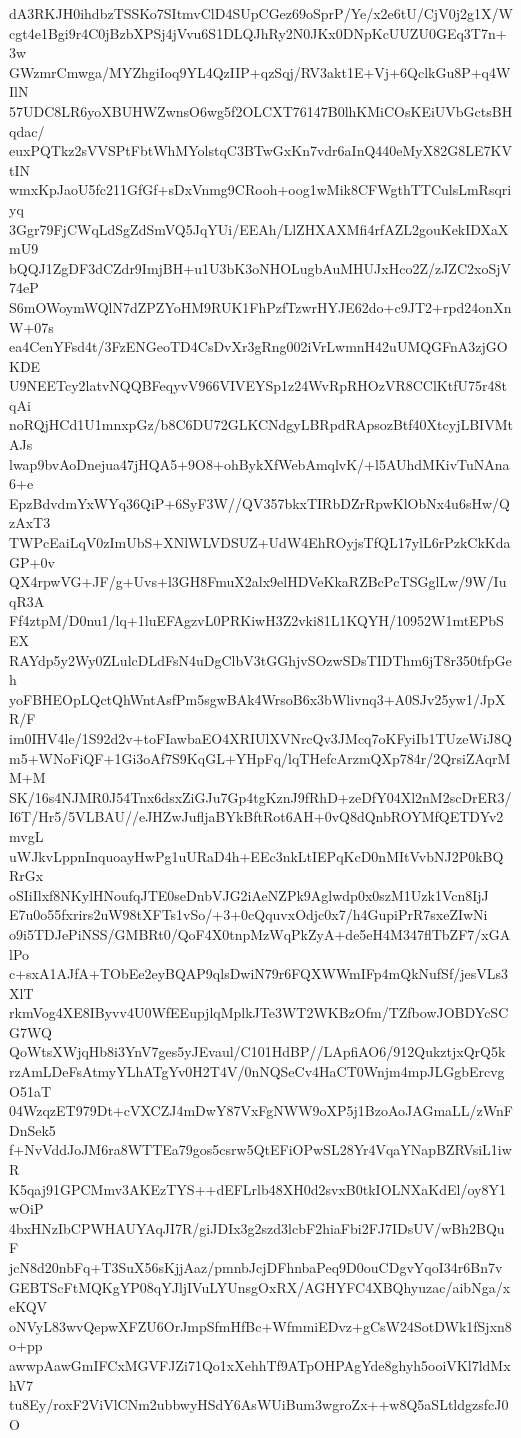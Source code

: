 dA3RKJH0ihdbzTSSKo7SItmvClD4SUpCGez69oSprP/Ye/x2e6tU/CjV0j2g1X/W
cgt4e1Bgi9r4C0jBzbXPSj4jVvu6S1DLQJhRy2N0JKx0DNpKcUUZU0GEq3T7n+3w
GWzmrCmwga/MYZhgiIoq9YL4QzIIP+qzSqj/RV3akt1E+Vj+6QclkGu8P+q4WIlN
57UDC8LR6yoXBUHWZwnsO6wg5f2OLCXT76147B0lhKMiCOsKEiUVbGctsBHqdac/
euxPQTkz2sVVSPtFbtWhMYolstqC3BTwGxKn7vdr6aInQ440eMyX82G8LE7KVtIN
wmxKpJaoU5fc211GfGf+sDxVnmg9CRooh+oog1wMik8CFWgthTTCulsLmRsqriyq
3Ggr79FjCWqLdSgZdSmVQ5JqYUi/EEAh/LlZHXAXMfi4rfAZL2gouKekIDXaXmU9
bQQJ1ZgDF3dCZdr9ImjBH+u1U3bK3oNHOLugbAuMHUJxHco2Z/zJZC2xoSjV74eP
S6mOWoymWQlN7dZPZYoHM9RUK1FhPzfTzwrHYJE62do+c9JT2+rpd24onXnW+07s
ea4CenYFsd4t/3FzENGeoTD4CsDvXr3gRng002iVrLwmnH42uUMQGFnA3zjGOKDE
U9NEETcy2latvNQQBFeqyvV966VIVEYSp1z24WvRpRHOzVR8CClKtfU75r48tqAi
noRQjHCd1U1mnxpGz/b8C6DU72GLKCNdgyLBRpdRApsozBtf40XtcyjLBIVMtAJs
lwap9bvAoDnejua47jHQA5+9O8+ohBykXfWebAmqlvK/+l5AUhdMKivTuNAna6+e
EpzBdvdmYxWYq36QiP+6SyF3W//QV357bkxTIRbDZrRpwKlObNx4u6sHw/QzAxT3
TWPcEaiLqV0zImUbS+XNlWLVDSUZ+UdW4EhROyjsTfQL17ylL6rPzkCkKdaGP+0v
QX4rpwVG+JF/g+Uvs+l3GH8FmuX2alx9elHDVeKkaRZBcPcTSGglLw/9W/IuqR3A
Ff4ztpM/D0nu1/lq+1luEFAgzvL0PRKiwH3Z2vki81L1KQYH/10952W1mtEPbSEX
RAYdp5y2Wy0ZLulcDLdFsN4uDgClbV3tGGhjvSOzwSDsTIDThm6jT8r350tfpGeh
yoFBHEOpLQctQhWntAsfPm5sgwBAk4WrsoB6x3bWlivnq3+A0SJv25yw1/JpXR/F
im0IHV4le/1S92d2v+toFIawbaEO4XRIUlXVNrcQv3JMcq7oKFyiIb1TUzeWiJ8Q
m5+WNoFiQF+1Gi3oAf7S9KqGL+YHpFq/lqTHefcArzmQXp784r/2QrsiZAqrMM+M
SK/16s4NJMR0J54Tnx6dsxZiGJu7Gp4tgKznJ9fRhD+zeDfY04Xl2nM2scDrER3/
I6T/Hr5/5VLBAU//eJHZwJufljaBYkBftRot6AH+0vQ8dQnbROYMfQETDYv2mvgL
uWJkvLppnInquoayHwPg1uURaD4h+EEc3nkLtIEPqKcD0nMItVvbNJ2P0kBQRrGx
oSIiIlxf8NKylHNoufqJTE0seDnbVJG2iAeNZPk9Aglwdp0x0szM1Uzk1Vcn8IjJ
E7u0o55fxrirs2uW98tXFTs1vSo/+3+0cQquvxOdjc0x7/h4GupiPrR7sxeZIwNi
o9i5TDJePiNSS/GMBRt0/QoF4X0tnpMzWqPkZyA+de5eH4M347flTbZF7/xGAlPo
c+sxA1AJfA+TObEe2eyBQAP9qlsDwiN79r6FQXWWmIFp4mQkNufSf/jesVLs3XlT
rkmVog4XE8IByvv4U0WfEEupjlqMplkJTe3WT2WKBzOfm/TZfbowJOBDYcSCG7WQ
QoWtsXWjqHb8i3YnV7ges5yJEvaul/C101HdBP//LApfiAO6/912QukztjxQrQ5k
rzAmLDeFsAtmyYLhATgYv0H2T4V/0nNQSeCv4HaCT0Wnjm4mpJLGgbErcvgO51aT
04WzqzET979Dt+cVXCZJ4mDwY87VxFgNWW9oXP5j1BzoAoJAGmaLL/zWnFDnSek5
f+NvVddJoJM6ra8WTTEa79gos5csrw5QtEFiOPwSL28Yr4VqaYNapBZRVsiL1iwR
K5qaj91GPCMmv3AKEzTYS++dEFLrlb48XH0d2svxB0tkIOLNXaKdEl/oy8Y1wOiP
4bxHNzIbCPWHAUYAqJI7R/giJDIx3g2szd3lcbF2hiaFbi2FJ7IDsUV/wBh2BQuF
jcN8d20nbFq+T3SuX56sKjjAaz/pmnbJcjDFhnbaPeq9D0ouCDgvYqoI34r6Bn7v
GEBTScFtMQKgYP08qYJljIVuLYUnsgOxRX/AGHYFC4XBQhyuzac/aibNga/xeKQV
oNVyL83wvQepwXFZU6OrJmpSfmHfBc+WfmmiEDvz+gCsW24SotDWk1fSjxn8o+pp
awwpAawGmIFCxMGVFJZi71Qo1xXehhTf9ATpOHPAgYde8ghyh5ooiVKl7ldMxhV7
tu8Ey/roxF2ViVlCNm2ubbwyHSdY6AsWUiBum3wgroZx++w8Q5aSLtldgzsfcJ0O

